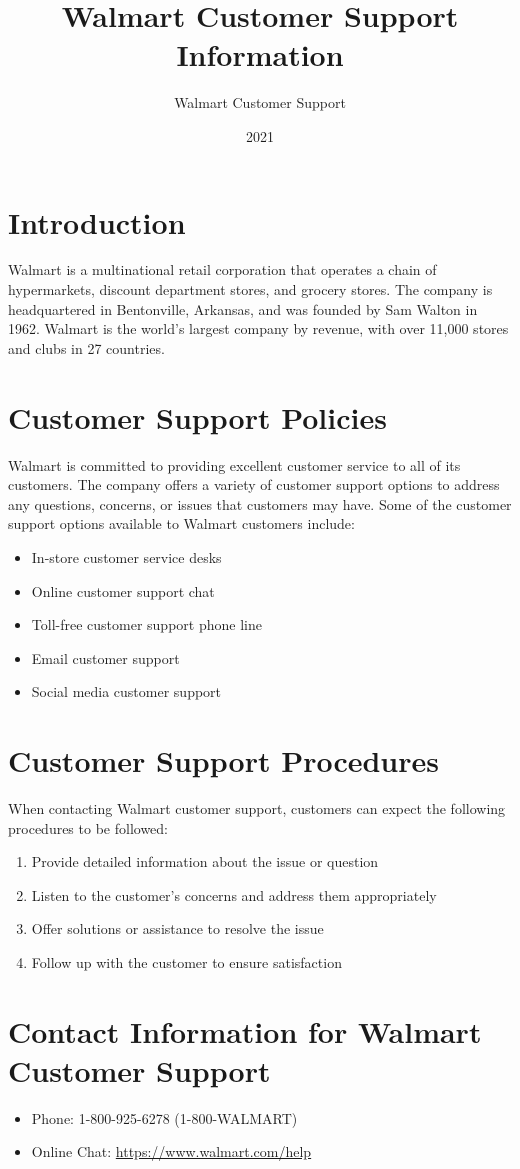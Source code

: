 \documentclass{article}
\title{Walmart Customer Support Information}
\author{Walmart Customer Support}
\date{2021}
\begin{document}
\maketitle

\section{Introduction}
Walmart is a multinational retail corporation that operates a chain of hypermarkets, discount department stores, and grocery stores. The company is headquartered in Bentonville, Arkansas, and was founded by Sam Walton in 1962. Walmart is the world's largest company by revenue, with over 11,000 stores and clubs in 27 countries.

\section{Customer Support Policies}
Walmart is committed to providing excellent customer service to all of its customers. The company offers a variety of customer support options to address any questions, concerns, or issues that customers may have. Some of the customer support options available to Walmart customers include:
\begin{itemize}
    \item In-store customer service desks
    \item Online customer support chat
    \item Toll-free customer support phone line
    \item Email customer support
    \item Social media customer support
\end{itemize}

\section{Customer Support Procedures}
When contacting Walmart customer support, customers can expect the following procedures to be followed:
\begin{enumerate}
    \item Provide detailed information about the issue or question
    \item Listen to the customer's concerns and address them appropriately
    \item Offer solutions or assistance to resolve the issue
    \item Follow up with the customer to ensure satisfaction
\end{enumerate}

\section{Contact Information for Walmart Customer Support}
\begin{itemize}
    \item Phone: 1-800-925-6278 (1-800-WALMART)
    \item Online Chat: \url{https://www.walmart.com/help}
\end{itemize}
\end{document}

